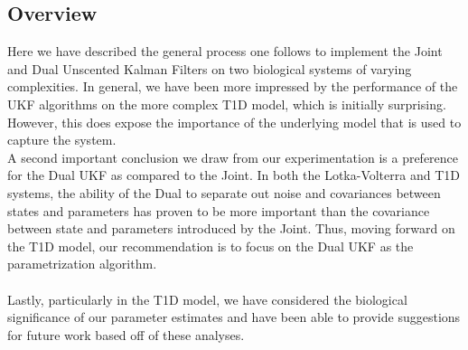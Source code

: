 \subsection{Overview}
Here we have described the general process one follows to implement the Joint and Dual Unscented Kalman Filters on two biological systems of varying complexities. In general, we have been more impressed by the performance of the UKF algorithms on the more complex T1D model, which is initially surprising. However, this does expose the importance of the underlying model that is used to capture the system. 
\\
A second important conclusion we draw from our experimentation is a preference for the Dual UKF as compared to the Joint. In both the Lotka-Volterra and T1D systems, the ability of the Dual to separate out noise and covariances between states and parameters has proven to be more important than the covariance between state and parameters introduced by the Joint. Thus, moving forward on the T1D model, our recommendation is to focus on the Dual UKF as the parametrization algorithm.\\
\\
Lastly, particularly in the T1D model, we have considered the biological significance of our parameter estimates and have been able to provide suggestions for future work based off of these analyses.
